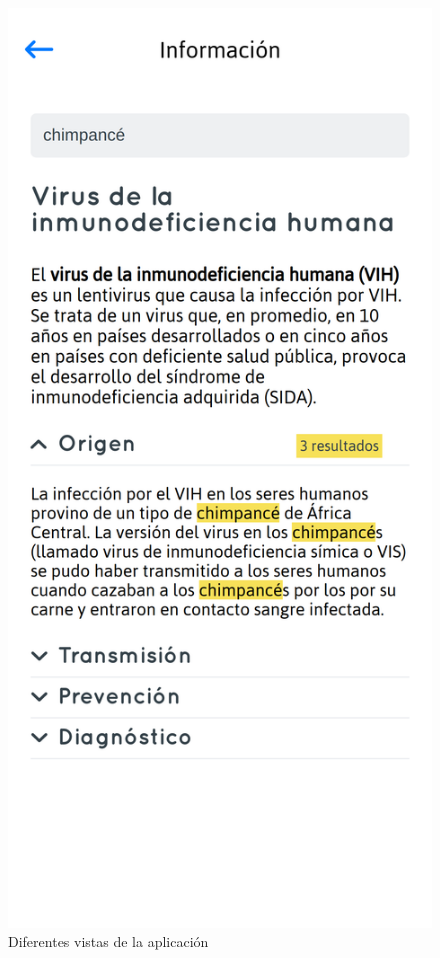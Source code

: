 \begin{figure}[htbp]
\includegraphics[scale=0.10]{../images/app_3.png}
\caption{Diferentes vistas de la aplicación}
\label{fig:vistas}
\end{figure}


